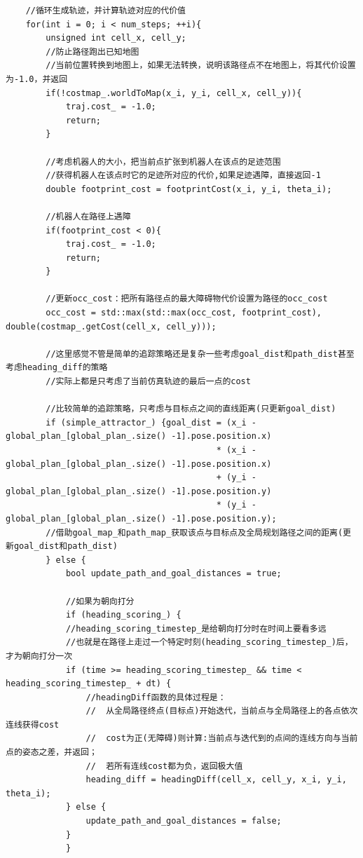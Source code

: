 \documentclass[9pt, oneside]{book}
\begin{document}
\footnotesize
\begin{verbatim}
    //循环生成轨迹，并计算轨迹对应的代价值
    for(int i = 0; i < num_steps; ++i){
        unsigned int cell_x, cell_y;
        //防止路径跑出已知地图
        //当前位置转换到地图上，如果无法转换，说明该路径点不在地图上，将其代价设置为-1.0，并返回
        if(!costmap_.worldToMap(x_i, y_i, cell_x, cell_y)){
            traj.cost_ = -1.0;
            return;
        }

        //考虑机器人的大小，把当前点扩张到机器人在该点的足迹范围
        //获得机器人在该点时它的足迹所对应的代价,如果足迹遇障，直接返回-1
        double footprint_cost = footprintCost(x_i, y_i, theta_i);

        //机器人在路径上遇障
        if(footprint_cost < 0){
            traj.cost_ = -1.0;
            return;
        }

        //更新occ_cost：把所有路径点的最大障碍物代价设置为路径的occ_cost
        occ_cost = std::max(std::max(occ_cost, footprint_cost), double(costmap_.getCost(cell_x, cell_y)));

        //这里感觉不管是简单的追踪策略还是复杂一些考虑goal_dist和path_dist甚至考虑heading_diff的策略
        //实际上都是只考虑了当前仿真轨迹的最后一点的cost

        //比较简单的追踪策略，只考虑与目标点之间的直线距离(只更新goal_dist)
        if (simple_attractor_) {goal_dist = (x_i - global_plan_[global_plan_.size() -1].pose.position.x) 
                                          * (x_i - global_plan_[global_plan_.size() -1].pose.position.x) 
                                          + (y_i - global_plan_[global_plan_.size() -1].pose.position.y) 
                                          * (y_i - global_plan_[global_plan_.size() -1].pose.position.y);
        //借助goal_map_和path_map_获取该点与目标点及全局规划路径之间的距离(更新goal_dist和path_dist)
        } else {
            bool update_path_and_goal_distances = true;

            //如果为朝向打分
            if (heading_scoring_) {
            //heading_scoring_timestep_是给朝向打分时在时间上要看多远
            //也就是在路径上走过一个特定时刻(heading_scoring_timestep_)后，才为朝向打分一次
            if (time >= heading_scoring_timestep_ && time < heading_scoring_timestep_ + dt) {
                //headingDiff函数的具体过程是：
                //  从全局路径终点(目标点)开始迭代，当前点与全局路径上的各点依次连线获得cost
                //  cost为正(无障碍)则计算:当前点与迭代到的点间的连线方向与当前点的姿态之差，并返回；
                //  若所有连线cost都为负，返回极大值
                heading_diff = headingDiff(cell_x, cell_y, x_i, y_i, theta_i);
            } else {
                update_path_and_goal_distances = false;
            }
            }


\end{verbatim}
\end{document}
